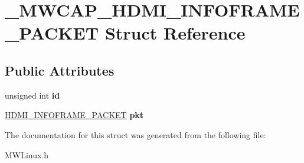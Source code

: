 \hypertarget{struct__MWCAP__HDMI__INFOFRAME__PACKET}{\section{\-\_\-\-M\-W\-C\-A\-P\-\_\-\-H\-D\-M\-I\-\_\-\-I\-N\-F\-O\-F\-R\-A\-M\-E\-\_\-\-P\-A\-C\-K\-E\-T Struct Reference}
\label{struct__MWCAP__HDMI__INFOFRAME__PACKET}
}
\subsection*{Public Attributes}
\begin{DoxyCompactItemize}
\item 
\hypertarget{struct__MWCAP__HDMI__INFOFRAME__PACKET_afcc5634c4caad02ae2e465ee9558e1fe}{unsigned int {\bfseries id}}\label{struct__MWCAP__HDMI__INFOFRAME__PACKET_afcc5634c4caad02ae2e465ee9558e1fe}

\item 
\hypertarget{struct__MWCAP__HDMI__INFOFRAME__PACKET_a76b67d28688734f86bc1d36665901cdc}{\hyperlink{struct__HDMI__INFOFRAME__PACKET}{H\-D\-M\-I\-\_\-\-I\-N\-F\-O\-F\-R\-A\-M\-E\-\_\-\-P\-A\-C\-K\-E\-T} {\bfseries pkt}}\label{struct__MWCAP__HDMI__INFOFRAME__PACKET_a76b67d28688734f86bc1d36665901cdc}

\end{DoxyCompactItemize}


The documentation for this struct was generated from the following file\-:\begin{DoxyCompactItemize}
\item 
M\-W\-Linux.\-h\end{DoxyCompactItemize}
